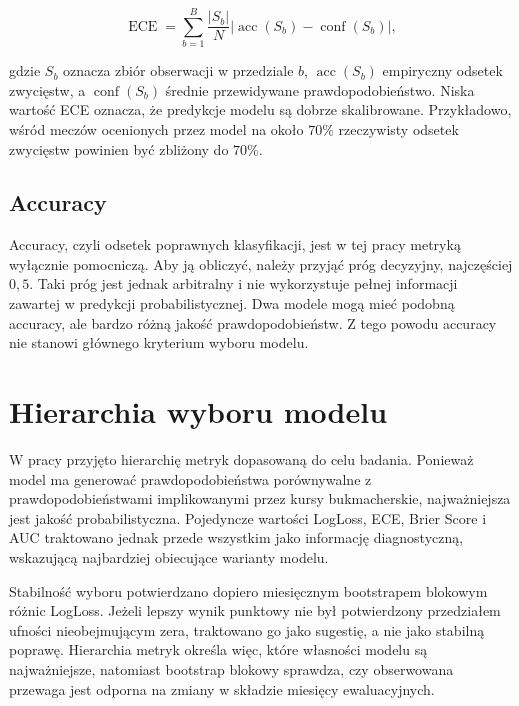 \begin{equation}
    \operatorname{ECE} = \sum_{b=1}^{B}\frac{|S_b|}{N}\left|\operatorname{acc}(S_b) - \operatorname{conf}(S_b)\right|,
\end{equation}

gdzie \(S_b\) oznacza zbiór obserwacji w przedziale \(b\), \(\operatorname{acc}(S_b)\) empiryczny
odsetek zwycięstw, a \(\operatorname{conf}(S_b)\) średnie przewidywane prawdopodobieństwo. Niska
wartość ECE oznacza, że predykcje modelu są dobrze skalibrowane. Przykładowo, wśród meczów
ocenionych przez model na około \(70\%\) rzeczywisty odsetek zwycięstw powinien być zbliżony do
\(70\%\).

\subsection{Accuracy}

Accuracy, czyli odsetek poprawnych klasyfikacji, jest w tej pracy metryką wyłącznie pomocniczą. Aby
ją obliczyć, należy przyjąć próg decyzyjny, najczęściej \(0{,}5\). Taki próg jest jednak arbitralny
i nie wykorzystuje pełnej informacji zawartej w predykcji probabilistycznej. Dwa modele mogą mieć
podobną accuracy, ale bardzo różną jakość prawdopodobieństw. Z tego powodu accuracy nie stanowi
głównego kryterium wyboru modelu.

\section{Hierarchia wyboru modelu}

W pracy przyjęto hierarchię metryk dopasowaną do celu badania. Ponieważ model ma generować
prawdopodobieństwa porównywalne z prawdopodobieństwami implikowanymi przez kursy bukmacherskie,
najważniejsza jest jakość probabilistyczna. Pojedyncze wartości LogLoss, ECE, Brier Score i AUC
traktowano jednak przede wszystkim jako informację diagnostyczną, wskazującą najbardziej obiecujące
warianty modelu.

Stabilność wyboru potwierdzano dopiero miesięcznym bootstrapem blokowym różnic LogLoss. Jeżeli
lepszy wynik punktowy nie był potwierdzony przedziałem ufności nieobejmującym zera, traktowano go
jako sugestię, a nie jako stabilną poprawę. Hierarchia metryk określa więc, które własności modelu
są najważniejsze, natomiast bootstrap blokowy sprawdza, czy obserwowana przewaga jest odporna na
zmiany w składzie miesięcy ewaluacyjnych.

